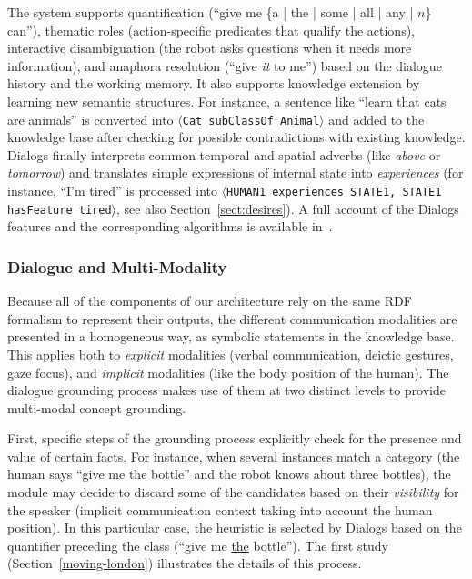 \documentclass[preprint,3p,times]{elsarticle}
\newcommand{\stmt}[1]{{\footnotesize\tt$\langle$#1\relax$\rangle$}}
\begin{document}
The system supports quantification (``give me \{a | the | some | all | any |
$n$\} can''), thematic roles (action-specific predicates that qualify the
actions), interactive disambiguation (the robot asks questions when it needs
more information), and anaphora resolution (``give \emph{it} to me'') based on
the dialogue history and the working memory. It also supports knowledge extension by learning new semantic
structures. For instance, a sentence like ``learn that cats are animals'' is
converted into \stmt{Cat subClassOf Animal} and added to the knowledge base
after checking for possible contradictions with existing knowledge. {\sc
Dialogs} finally interprets common temporal and spatial adverbs (like
\emph{above} or \emph{tomorrow}) and translates simple expressions of internal
state  into \emph{experiences} (for instance, ``I'm tired'' is processed into
\stmt{HUMAN1 experiences STATE1, STATE1 hasFeature tired}, see also
Section~\ref{sect:desires}). A full account of the {\sc Dialogs} features and
the corresponding algorithms is available in~\cite{Lemaignan2011a}.

\subsubsection{Dialogue and Multi-Modality}

Because all of the components of our architecture rely on the same RDF formalism to
represent their outputs, the different communication modalities are presented in
a homogeneous way, as symbolic statements in the knowledge base. This applies
both to \emph{explicit} modalities (verbal communication, deictic gestures,
gaze focus), and \emph{implicit} modalities (like the body position of the
human). The dialogue grounding process makes use of them at two distinct levels
to provide multi-modal concept grounding.

First, specific steps of the grounding process explicitly check for the presence
and value of certain facts. For instance, when several instances match a
category (the human says ``give me the bottle'' and the robot knows about three
bottles), the module may decide to discard some of the candidates based on their
\emph{visibility} for the speaker (implicit communication context taking into
account the human position). In this particular case, the heuristic is selected
by {\sc Dialogs} based on the quantifier preceding the class (``give me
\underline{the} bottle''). The first study (Section~\ref{moving-london})
illustrates the details of this process.
\end{document}
